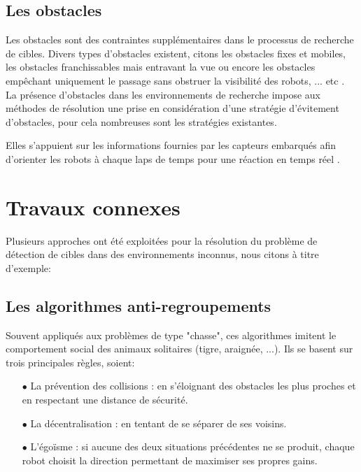 \subsection{Les obstacles}
Les obstacles sont des contraintes supplémentaires dans le processus de recherche de cibles. Divers types d'obstacles existent, citons les obstacles fixes et mobiles, les obstacles franchissables mais entravant la vue ou encore les obstacles empêchant uniquement le passage sans obstruer la visibilité des robots, ... etc \cite{surv2}.\\

La présence d'obstacles dans les environnements de recherche impose aux méthodes de résolution une prise en considération d'une stratégie d'évitement d'obstacles, pour cela nombreuses sont les stratégies existantes.

Elles s'appuient sur les informations fournies par les capteurs embarqués afin d'orienter les robots à chaque laps de temps pour une réaction en temps réel \cite{Sara}. 







\section{Travaux connexes}
Plusieurs approches ont été exploitées pour la résolution du problème de détection de cibles dans des environnements inconnus, nous citons à titre d'exemple:

\subsection{Les algorithmes anti-regroupements \cite{Miao2010}}
Souvent appliqués aux problèmes de type "chasse", ces algorithmes imitent le comportement social des animaux solitaires (tigre, araignée, ...). Ils se basent sur trois principales règles, soient:

\begin{itemize}
	\item[$\bullet$] La prévention des collisions : en s'éloignant des obstacles les plus proches et en respectant une distance de sécurité.
	
	\item[$\bullet$] La décentralisation : en tentant de se séparer de ses voisins.
	
	\item[$\bullet$] L'égoïsme : si aucune des deux situations précédentes ne se produit, chaque robot choisit la direction permettant de maximiser ses propres gains.
\end{itemize}


